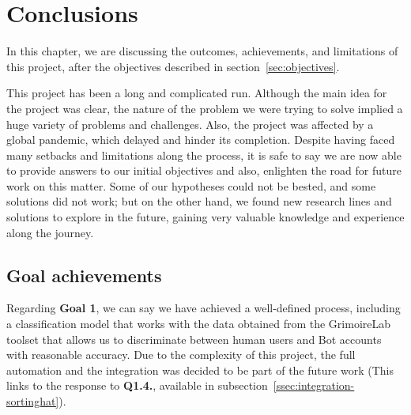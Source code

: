 \documentclass[a4paper, 12pt]{book}
\begin{document}

\cleardoublepage



\chapter{Conclusions}
\label{chap:conclusions}

In this chapter, we are discussing the outcomes, achievements, and limitations of this project, after the objectives described in section~\ref{sec:objectives}.

This project has been a long and complicated run. Although the main idea for the project was clear, the nature of the problem we were trying to solve implied a huge variety of problems and challenges. Also, the project was affected by a global pandemic, which delayed and hinder its completion. Despite having faced many setbacks and limitations along the process, it is safe to say we are now able to provide answers to our initial objectives and also, enlighten the road for future work on this matter. Some of our hypotheses could not be bested, and some solutions did not work; but on the other hand, we found new research lines and solutions to explore in the future, gaining very valuable knowledge and experience along the journey.

\section{Goal achievements}
\label{sec:goal-achievements}

Regarding \textbf{Goal 1}, we can say we have achieved a well-defined process, including a classification model that works with the data obtained from the GrimoireLab toolset that allows us to discriminate between human users and Bot accounts with reasonable accuracy. Due to the complexity of this project, the full automation and the integration was decided to be part of the future work (This links to the response to \textbf{Q1.4.}, available in subsection~\ref{ssec:integration-sortinghat}).
\end{document}
